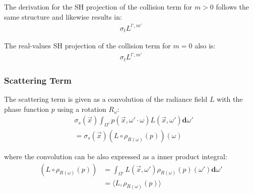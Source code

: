 \documentclass[10pt]{scrartcl}
\begin{document}
The derivation for the SH projection of the collision term for $m>0$ follows the same structure and likewise results in:
\begin{align}
\sigma_t L^{l',m'}
\end{align}

The real-values SH projection of the collision term for $m=0$ also is:
\begin{align}
\sigma_t L^{l',m'}
\end{align}


\subsubsection{Scattering Term}

The scattering term is given as a convolution of the radiance field $L$ with the phase function $p$ using a rotation $R_\omega$:
\begin{align*}
&
\sigma_s(\vec{x})\int_{\Omega'}p(\vec{x}, \omega'\cdot\omega)L(\vec{x}, \omega')\mathbf{d}\omega'
\\
&= \sigma_s(\vec{x})(L\circ \rho_{R(\omega)}(p))(\omega)
\end{align*}

where the convolution can be also expressed as a inner product integral:
\begin{align*}
(L\circ \rho_{R(\omega)}(p)) &= \int_{\Omega'}{L(\vec{x}, \omega')\rho_{R(\omega)}(p)(\omega')\mathbf{d}\omega'} \\
&= \langle L,  \rho_{R(\omega)}(p)\rangle
\end{align*}
\end{document}
